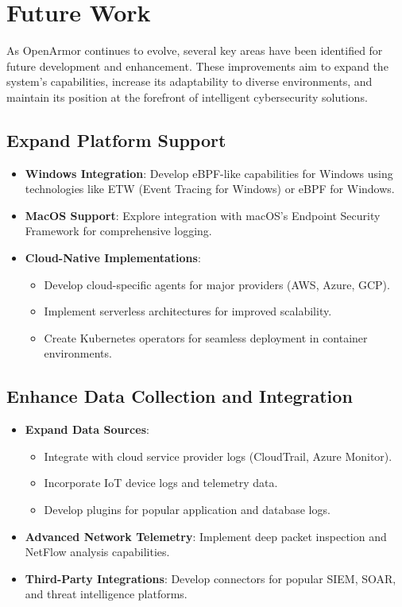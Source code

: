 \chapter{Future Work}

As OpenArmor continues to evolve, several key areas have been identified for future development and enhancement. These improvements aim to expand the system's capabilities, increase its adaptability to diverse environments, and maintain its position at the forefront of intelligent cybersecurity solutions.

\section{Expand Platform Support}
\begin{itemize}
    \item \textbf{Windows Integration}: Develop eBPF-like capabilities for Windows using technologies like ETW (Event Tracing for Windows) or eBPF for Windows.
    \item \textbf{MacOS Support}: Explore integration with macOS's Endpoint Security Framework for comprehensive logging.
    \item \textbf{Cloud-Native Implementations}: 
    \begin{itemize}
        \item Develop cloud-specific agents for major providers (AWS, Azure, GCP).
        \item Implement serverless architectures for improved scalability.
        \item Create Kubernetes operators for seamless deployment in container environments.
    \end{itemize}
\end{itemize}

\section{Enhance Data Collection and Integration}
\begin{itemize}
    \item \textbf{Expand Data Sources}:
    \begin{itemize}
        \item Integrate with cloud service provider logs (CloudTrail, Azure Monitor).
        \item Incorporate IoT device logs and telemetry data.
        \item Develop plugins for popular application and database logs.
    \end{itemize}
    \item \textbf{Advanced Network Telemetry}: Implement deep packet inspection and NetFlow analysis capabilities.
    \item \textbf{Third-Party Integrations}: Develop connectors for popular SIEM, SOAR, and threat intelligence platforms.
\end{itemize}


